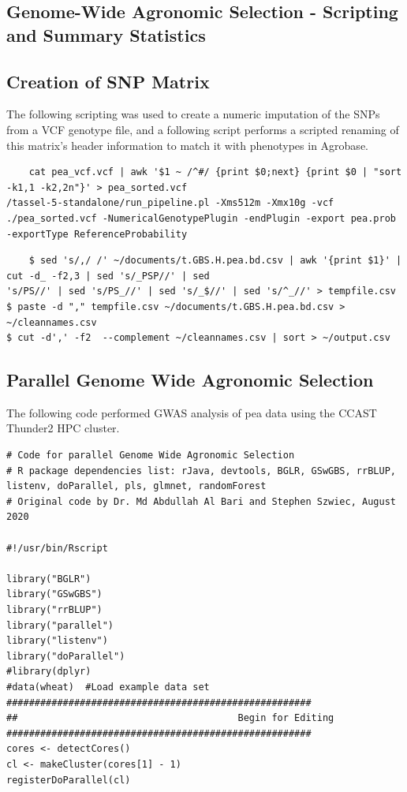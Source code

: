 \documentclass[12pt, letterpaper,oneocolumn]{article}
\begin{document}
\begin{appendices}
	\section{Genome-Wide Agronomic Selection - Scripting and Summary Statistics}

	\subsection{Creation of SNP Matrix}
	The following scripting was used to create a numeric imputation of the SNPs from a VCF genotype file, and a following script performs a scripted renaming of this matrix's header information to match it with phenotypes in Agrobase.

	\lstset{language=BASH}
	\begin{lstlisting}
	cat pea_vcf.vcf | awk '$1 ~ /^#/ {print $0;next} {print $0 | "sort -k1,1 -k2,2n"}' > pea_sorted.vcf
/tassel-5-standalone/run_pipeline.pl -Xms512m -Xmx10g -vcf ./pea_sorted.vcf -NumericalGenotypePlugin -endPlugin -export pea.prob -exportType ReferenceProbability
	\end{lstlisting}


	\begin{lstlisting}
	$ sed 's/,/ /' ~/documents/t.GBS.H.pea.bd.csv | awk '{print $1}' | cut -d_ -f2,3 | sed 's/_PSP//' | sed
's/PS//' | sed 's/PS_//' | sed 's/_$//' | sed 's/^_//' > tempfile.csv
$ paste -d "," tempfile.csv ~/documents/t.GBS.H.pea.bd.csv > ~/cleannames.csv
$ cut -d',' -f2  --complement ~/cleannames.csv | sort > ~/output.csv
	\end{lstlisting}

	\subsection{Parallel Genome Wide Agronomic Selection}
	The following code performed GWAS analysis of pea data using the CCAST Thunder2 HPC cluster.

	\lstset{language=R}
	\begin{lstlisting}
# Code for parallel Genome Wide Agronomic Selection
# R package dependencies list: rJava, devtools, BGLR, GSwGBS, rrBLUP, listenv, doParallel, pls, glmnet, randomForest
# Original code by Dr. Md Abdullah Al Bari and Stephen Szwiec, August 2020

#!/usr/bin/Rscript

library("BGLR")
library("GSwGBS")
library("rrBLUP")
library("parallel")
library("listenv")
library("doParallel")
#library(dplyr)
#data(wheat)  #Load example data set
######################################################
##                                       Begin for Editing
######################################################
cores <- detectCores()
cl <- makeCluster(cores[1] - 1)
registerDoParallel(cl)


\end{lstlisting}
\end{appendices}
\end{document}
